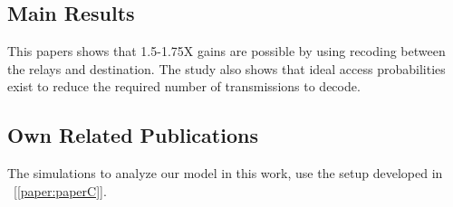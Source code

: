 \subsection*{Main Results}
This papers shows that 1.5-1.75X gains are possible by using recoding between the relays and destination. The study also shows that ideal access probabilities exist to reduce the required number of transmissions to decode. 

\subsection*{Own Related Publications}
The simulations to analyze our model in this work, use the setup developed in ~[\ref{paper:paperC}].

\clearpage
